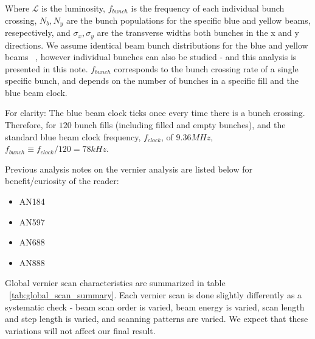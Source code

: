 Where $\mathcal{L}$ is the luminosity, $f_{bunch}$ is the frequency of each individual
bunch crossing, $N_{b}, N_{y}$ are the bunch populations for the specific blue and yellow
beams, resepectively, and $\sigma_{x}, \sigma_{y}$ are the transverse widths both bunches
in the x and y directions. We assume identical beam bunch distributions for the blue and
yellow beams ~\cite{AN888Datta2010}, however individual bunches can also be studied - and this
analysis is presented in this note. $f_{bunch}$ corresponds to the bunch crossing rate of
a single specific bunch, and depends on the number of bunches in a specific fill and the
blue beam clock.

For clarity: The blue beam clock ticks once every time there is a bunch crossing.
Therefore, for $120$ bunch fills (including filled and empty bunches), and the standard
blue beam clock frequency, $f_{clock}$, of $9.36 MHz$, $f_{bunch} \equiv f_{clock} / 120 =
78 kHz$.

Previous analysis notes on the vernier analysis are listed below for benefit/curiosity of
the reader:

\begin{itemize}
\item AN184~\cite{AN184Belikov2003}
\item AN597~\cite{an597Bazilevsky2007}
\item AN688~\cite{an688Bennet2008}
\item AN888~\cite{AN888Datta2010}
\end{itemize}

Global vernier scan characteristics are summarized in table
~\ref{tab:global_scan_summary}. Each vernier scan is done slightly differently as a
systematic check - beam scan order is varied, beam energy is varied, scan length and step
length is varied, and scanning patterns are varied. We expect that these variations will
not affect our final result.




\setcounter{page}{1}

\clearpage

\resetlinenumber

\clearpage

\resetlinenumber

\tableofcontents

\clearpage

\resetlinenumber
